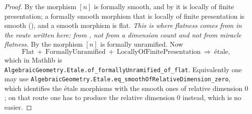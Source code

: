 \begin{proof}
\leanok
By  the morphism $[n]$ is formally smooth,
and by  it is locally of finite presentation; a formally
smooth morphism that is locally of finite presentation is smooth
(), and a smooth morphism is flat.  \emph{This is where
flatness comes from in the route written here: from
, not from a dimension count and not from
miracle flatness.}  By  the morphism
$[n]$ is formally unramified.  Now
\[
  \text{Flat}\ +\ \text{FormallyUnramified}\ +\
  \text{LocallyOfFinitePresentation}\ \Longrightarrow\ \text{\'etale},
\]
which in Mathlib is
\texttt{AlgebraicGeometry.Etale.of\_formallyUnramified\_of\_flat}.
Equivalently one may use
\texttt{AlgebraicGeometry.Etale.eq\_smoothOfRelativeDimension\_zero}, which
identifies the \'etale morphisms with the smooth ones of relative dimension
$0$; on that route one has to produce the relative dimension $0$ instead, which
is no easier.
\end{proof}

